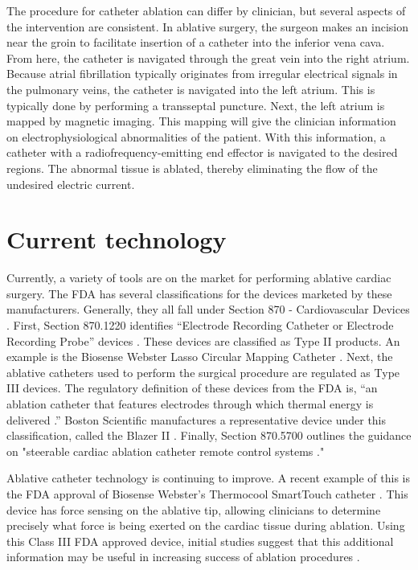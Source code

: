 \documentclass[letterpaper,10pt,conference]{ieeeconf}   %
\begin{document}
The procedure for catheter ablation can differ by clinician, but several aspects of the intervention are consistent. In ablative surgery, the surgeon makes an incision near the groin to facilitate insertion of a catheter into the inferior vena cava. From here, the catheter is navigated through the great vein into the right atrium. Because atrial fibrillation typically originates from irregular electrical signals in the pulmonary veins, the catheter is navigated into the left atrium. This is typically done by performing a transseptal puncture. Next, the left atrium is mapped by magnetic imaging. This mapping will give the clinician information on electrophysiological abnormalities of the patient. With this information, a catheter with a radiofrequency-emitting end effector is navigated to the desired regions. The abnormal tissue is ablated, thereby eliminating the flow of the undesired electric current. 


\section{Current technology}
\label{sec:currenttech}

Currently, a variety of tools are on the market for performing ablative cardiac surgery. The FDA has several classifications for the devices marketed by these manufacturers. Generally, they all fall under Section 870 - Cardiovascular Devices \cite{FDA:870}. First, Section 870.1220 identifies ``Electrode Recording Catheter or Electrode Recording Probe'' devices \cite{FDA:870.1220}. These devices are classified as Type II products. An example is the Biosense Webster Lasso Circular Mapping Catheter \cite{BiosenseWebster:Lasso2515}.  Next, the ablative catheters used to perform the surgical procedure are regulated as Type III devices. The regulatory definition of these devices from the FDA is, ``an ablation catheter that features electrodes through which thermal energy is delivered \cite{FDA:OAD}.'' Boston Scientific manufactures a representative device under this classification, called the Blazer II \cite{BostonScientific:BlazerII}. Finally, Section 870.5700 outlines the guidance on "steerable cardiac ablation catheter remote control systems \cite{FDA:870.5700}." 

Ablative catheter technology is continuing to improve. A recent example of this is the FDA approval of Biosense Webster's Thermocool SmartTouch catheter \cite{BioSenseWebster:FDAApproval}. This device has force sensing on the ablative tip, allowing clinicians to determine precisely what force is being exerted on the cardiac tissue during ablation. Using this Class III FDA approved device, initial studies suggest that this additional information may be useful in increasing success of ablation procedures \cite{natale:14a}.  
\end{document}
